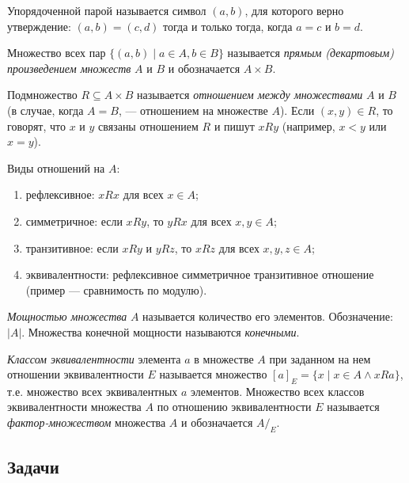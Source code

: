 Упорядоченной парой называется символ $(a,b)$, для которого верно утверждение: $(a,b)=(c,d)$ тогда и только тогда, когда $a=c$ и $b=d$.

Множество всех пар $\{(a,b)\mid a\in A, b\in B\}$ называется \textit{прямым (декартовым) произведением множеств} $A$ и $B$ и обозначается $A\times B$.

Подмножество $R\subseteq A\times B$ называется \textit{отношением между множествами} $A$ и $B$ (в случае, когда $A=B$, --- отношением на множестве $A$). Если $(x,y)\in R$, то говорят, что $x$ и $y$ связаны отношением $R$ и пишут $xRy$ (например, $x<y$ или $x=y$).

Виды отношений на $A$:
\begin{enumerate}[R1]
\item рефлексивное: $xRx$ для всех $x\in A$;
\item симметричное: если $xRy$, то $yRx$ для всех $x,y\in A$;
\item транзитивное: если $xRy$ и $yRz$, то $xRz$ для всех $x,y,z\in A$;
\item эквивалентности: рефлексивное симметричное транзитивное отношение (пример --- сравнимость по модулю).
\end{enumerate}

\textit{Мощностью множества} $A$ называется количество его элементов. Обозначение: $|A|$. Множества конечной мощности называются \textit{конечными}.

\textit{Классом эквивалентности} элемента $a$ в множестве $A$ при заданном на нем отношении эквивалентности $E$ называется множество $[a]_E=\{x\mid x\in A\land xRa\}$, т.е. множество всех эквивалентных $a$ элементов. Множество всех классов эквивалентности множества $A$ по отношению эквивалентности $E$ называется \textit{фактор-множеством} множества $A$ и обозначается $A/_E$.

\subsection*{Задачи}

